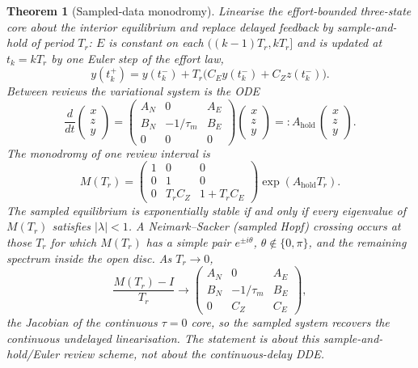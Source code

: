 \documentclass[11pt]{article}
\newtheorem{theorem}{Theorem}
\theoremstyle{definition}
\begin{document}
\begin{theorem}[Sampled-data monodromy]
\label{thm:sampled}
Linearise the effort-bounded three-state core about the interior equilibrium and replace delayed feedback by sample-and-hold of period $T_r$: $E$ is constant on each $((k-1)T_r,kT_r]$ and is updated at $t_k=kT_r$ by one Euler step of the effort law,
\[
y(t_k^+)=y(t_k^-)+T_r\bigl(C_E y(t_k^-)+C_Z z(t_k^-)\bigr).
\]
Between reviews the variational system is the ODE
\begin{equation}
\frac{d}{dt}\begin{pmatrix}x\\z\\y\end{pmatrix}
=
\begin{pmatrix}A_N&0&A_E\\ B_N&-1/\tau_m&B_E\\ 0&0&0\end{pmatrix}
\begin{pmatrix}x\\z\\y\end{pmatrix}
=:A_{\mathrm{hold}}\,
\begin{pmatrix}x\\z\\y\end{pmatrix}.
\label{eq:hold}
\end{equation}
The monodromy of one review interval is
\begin{equation}
M(T_r)=
\begin{pmatrix}1&0&0\\0&1&0\\0&T_r C_Z&1+T_r C_E\end{pmatrix}
\exp(A_{\mathrm{hold}}T_r).
\label{eq:monodromy}
\end{equation}
The sampled equilibrium is exponentially stable if and only if every eigenvalue of $M(T_r)$ satisfies $|\lambda|<1$. A Neimark--Sacker (sampled Hopf) crossing occurs at those $T_r$ for which $M(T_r)$ has a simple pair $e^{\pm i\theta}$, $\theta\notin\{0,\pi\}$, and the remaining spectrum inside the open disc. As $T_r\to 0$,
\[
\frac{M(T_r)-I}{T_r}\to
\begin{pmatrix}A_N&0&A_E\\ B_N&-1/\tau_m&B_E\\ 0&C_Z&C_E\end{pmatrix},
\]
the Jacobian of the continuous $\tau=0$ core, so the sampled system recovers the continuous undelayed linearisation. The statement is about this sample-and-hold/Euler review scheme, not about the continuous-delay DDE.
\end{theorem}
\end{document}
